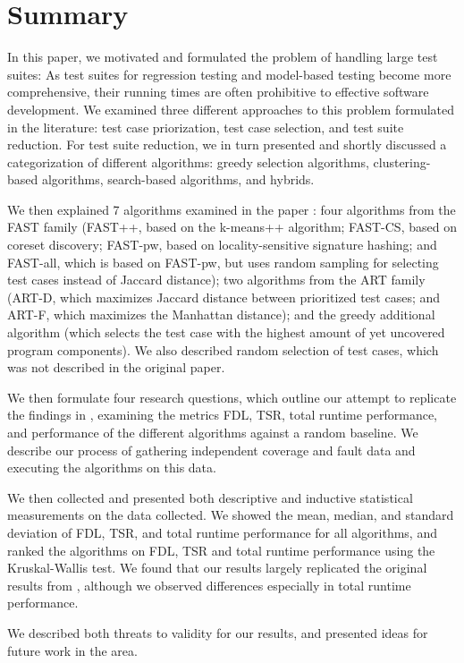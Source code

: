 
\chapter{Summary}\label{chapter:summary}

In this paper, we motivated and formulated the problem of handling large
test suites: As test suites for regression testing and model-based testing
become more comprehensive, their running times are often prohibitive to
effective software development. We examined three different approaches
to this problem formulated in the literature: test case priorization,
test case selection, and test suite reduction. For test suite reduction,
we in turn presented and shortly discussed a categorization of different
algorithms: greedy selection algorithms, clustering-based algorithms,
search-based algorithms, and hybrids.

We then explained 7 algorithms examined in the paper
\cite{cruciani2019scalable}: four algorithms from the FAST family (FAST++,
based on the k-means++ algorithm; FAST-CS, based on coreset discovery;
FAST-pw, based on locality-sensitive signature hashing; and FAST-all,
which is based on FAST-pw, but uses random sampling for selecting test
cases instead of Jaccard distance); two algorithms from the ART family
(ART-D, which maximizes Jaccard distance between prioritized test cases;
and ART-F, which maximizes the Manhattan distance); and the greedy
additional algorithm (which selects the test case with the highest amount
of yet uncovered program components). We also described random selection
of test cases, which was not described in the original paper.

We then formulate four research questions, which outline our attempt
to replicate the findings in \cite{cruciani2019scalable}, examining
the metrics FDL, TSR, total runtime performance, and performance of
the different algorithms against a random baseline. We describe our
process of gathering independent coverage and fault data and executing
the algorithms on this data.

We then collected and presented both descriptive and inductive statistical
measurements on the data collected. We showed the mean, median, and
standard deviation of FDL, TSR, and total runtime performance for all
algorithms, and ranked the algorithms on FDL, TSR and total runtime
performance using the Kruskal-Wallis test. We found that our results largely
replicated the original results from \cite{cruciani2019scalable}, although
we observed differences especially in total runtime performance.

We described both threats to validity for our results, and presented
ideas for future work in the area.
